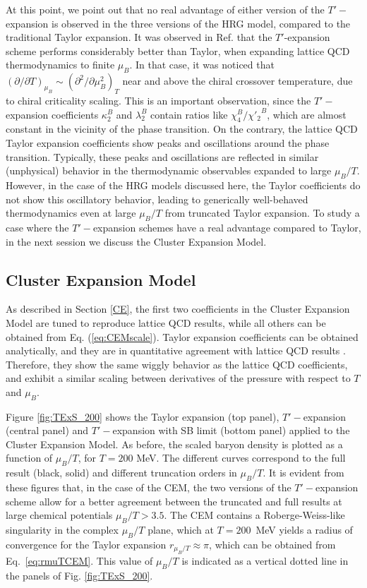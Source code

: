 \documentclass[%
 reprint,
nofootinbib,
 amsmath,amssymb,
 aps,
prc
]{revtex4-2}
\begin{document}
At this point, we point out that no real advantage of either version of the $T'-$expansion is 
observed in the three versions of the HRG model, compared to the traditional Taylor expansion.  It was observed in Ref. \cite{Borsanyi:2021sxv} that the $T'$-expansion scheme performs considerably better than  Taylor, when expanding lattice QCD thermodynamics to finite $\mu_B$. In that case, it was noticed that $(\partial / \partial T)_{\mu_B} \sim (\partial^2/\partial \mu_B^2)_T$ near and above the chiral crossover temperature, due to chiral criticality scaling. This is an important observation, since the $T'-$expansion coefficients $\kappa_{2}^{B}$ and $\lambda_{2}^{B}$ contain ratios like $\chi_{4}^{B}/{\chi'_{2}}^{B}$, which are almost constant in the vicinity of the phase transition. On the contrary, the lattice QCD Taylor expansion coefficients show peaks and oscillations around the phase transition. Typically, these peaks and oscillations are reflected in similar (unphysical) behavior in the thermodynamic observables expanded to large $\mu_B/T$. However, in the case of the HRG models discussed here, the Taylor coefficients do not show this oscillatory behavior, leading to generically well-behaved thermodynamics even at large $\mu_B/T$ from truncated Taylor expansion. To study a case where the $T'-$expansion schemes have a real advantage compared to Taylor, in the next session we discuss the Cluster Expansion Model.

\subsection{Cluster Expansion Model}
As described in Section \ref{CE}, the first two coefficients in the Cluster Expansion Model are tuned to reproduce lattice QCD results, while all others can be obtained from Eq. (\ref{eq:CEMscale}).
Taylor expansion coefficients can be obtained analytically, and they are in quantitative agreement with lattice QCD results \cite{Vovchenko:2017gkg}.  Therefore, they show the same wiggly behavior as the lattice QCD coefficients, and exhibit a similar scaling between derivatives of the pressure with respect to $T$ and $\mu_B$.

Figure \ref{fig:TExS_200} shows the Taylor expansion (top panel), $T'-$expansion (central panel) and $T'-$expansion with SB limit (bottom panel) applied to the Cluster Expansion Model. As before, the scaled baryon density is plotted as a function of $\mu_B/T$, for $T=200$ MeV. The different curves correspond to the full result (black, solid) and different truncation orders in $\mu_B/T$. It is evident from these figures that, in the case of the CEM, the two versions of the $T'-$expansion scheme allow for a better agreement between the truncated and full results at large chemical potentials $\mu_B/T>3.5$. 
The CEM contains a Roberge-Weiss-like singularity in the complex $\mu_B/T$ plane, which at $T = 200$~MeV yields a radius of convergence for the Taylor expansion $r_{\mu_B/T} \approx \pi$, which can be obtained from  Eq.~\eqref{eq:rmuTCEM}. This value of $\mu_B/T$ is indicated as a vertical dotted line in the panels of Fig. \ref{fig:TExS_200}.
\end{document}
